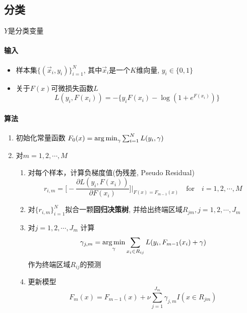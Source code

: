 \subsection{分类}

$Y$是分类变量

\paragraph{输入}

\begin{itemize}
    \item 样本集$\{(\vec{x}_i, y_i)\}_{i=1}^N$, 其中$\vec{x}_i$是一个$K$维向量, $y_i\in \{0,1\} $
    \item 关于$F(x)$可微损失函数$L$
          \begin{equation*}
              L(y_i, F(x_i)) = -\Big\{y_iF(x_i) - \log (1 + e^{F(x_i)})\Big\}
          \end{equation*}
\end{itemize}

\paragraph{算法}

\begin{enumerate}
    \item 初始化常量函数 $F_0(x) = \operatorname*{arg\,min}_\gamma \sum_{i=1}^NL(y_i, \gamma)$
    \item 对$m=1,2,\cdots, M$
          \begin{enumerate}
              \item 对每个样本，计算负梯度值(伪残差, Pseudo Residual)
                    \begin{equation*}
                        r_{i,m} = \Bigg[-\frac{\partial L(y_i, F(x_i))}{\partial F(x_i)}\Bigg]\Bigg|_{F(x)=F_{m-1}(x)} \quad \text{for} \quad i=1,2,\cdots,M
                    \end{equation*}
              \item 对$\{r_{i,m}\}_{i=1}^N$拟合一颗\textbf{回归决策树}, 并给出终端区域$R_{jm}, j=1,2,\cdots,J_m$
              \item 对$j=1,2,\cdots, J_m$ 计算
                    \begin{equation}\label{opt_gbdt_cls_reg_dt}
                        \gamma_{j,m} = \operatorname*{arg\,min}_{\gamma} \sum_{x_i\in R_{ij}}L(y_i, F_{m-1}(x_i) + \gamma)
                    \end{equation}
                    作为终端区域$R_{ij}$的预测
              \item 更新模型
                    \begin{equation*}
                        F_m(x) = F_{m-1}(x) + \nu \sum_{j=1}^{J_m}\gamma_{j,m}I(x\in R_{jm})
                    \end{equation*}
          \end{enumerate}
\end{enumerate}

